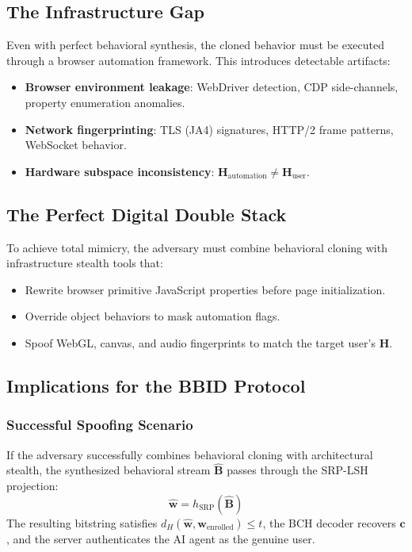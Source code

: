 \documentclass[11pt,twoside]{amsart}
\theoremstyle{plain}
\theoremstyle{definition}
\theoremstyle{remark}
\newcommand{\bH}{\mathbf{H}}
\newcommand{\bB}{\mathbf{B}}
\newcommand{\bw}{\mathbf{w}}
\newcommand{\bc}{\mathbf{c}}
\begin{document}
\subsection{The Infrastructure Gap}

Even with perfect behavioral synthesis, the cloned behavior must be executed through a browser automation framework. This introduces detectable artifacts:
\begin{itemize}
    \item \textbf{Browser environment leakage}: WebDriver detection, CDP side-channels, property enumeration anomalies.
    \item \textbf{Network fingerprinting}: TLS (JA4) signatures, HTTP/2 frame patterns, WebSocket behavior.
    \item \textbf{Hardware subspace inconsistency}: $\bH_{\text{automation}} \neq \bH_{\text{user}}$.
\end{itemize}

\subsection{The Perfect Digital Double Stack}

To achieve total mimicry, the adversary must combine behavioral cloning with infrastructure stealth tools that:
\begin{itemize}
    \item Rewrite browser primitive JavaScript properties before page initialization.
    \item Override object behaviors to mask automation flags.
    \item Spoof WebGL, canvas, and audio fingerprints to match the target user's $\bH$.
\end{itemize}

\subsection{Implications for the BBID Protocol}

\subsubsection{Successful Spoofing Scenario}

If the adversary successfully combines behavioral cloning with architectural stealth, the synthesized behavioral stream $\hat{\bB}$ passes through the SRP-LSH projection:
\begin{equation}
\hat{\bw} = h_{\text{SRP}}(\hat{\bB})
\end{equation}
The resulting bitstring satisfies $d_H(\hat{\bw}, \bw_{\text{enrolled}}) \leq t$, the BCH decoder recovers $\bc$, and the server authenticates the AI agent as the genuine user.
\end{document}
